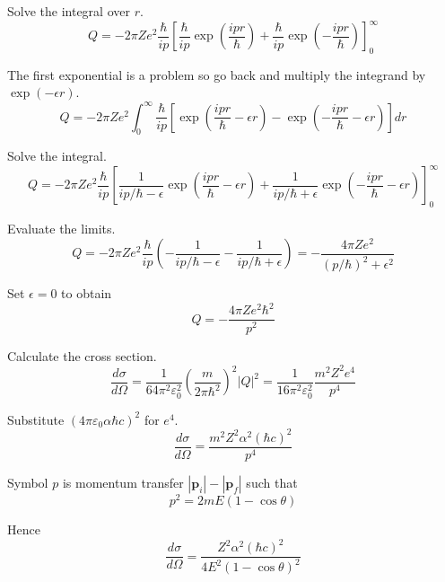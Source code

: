 Solve the integral over $r$.
\begin{equation*}
Q=-2\pi Ze^2\frac{\hbar}{ip}
\left[
\frac{\hbar}{ip}
\exp\left(\frac{ipr}{\hbar}\right)
+\frac{\hbar}{ip}
\exp\left(-\frac{ipr}{\hbar}\right)
\right]_0^\infty
\end{equation*}

The first exponential is a problem
so go back and multiply the integrand by $\exp(-\epsilon r)$.
\begin{equation*}
Q=-2\pi Ze^2
\int_0^\infty
\frac{\hbar}{ip}
\left[\exp\left(\frac{ipr}{\hbar}-\epsilon r\right)
-\exp\left(-\frac{ipr}{\hbar}-\epsilon r\right)\right]
dr
\end{equation*}

Solve the integral.
\begin{equation*}
Q=-2\pi Ze^2
\frac{\hbar}{ip}
\left[
\frac{1}{ip/\hbar-\epsilon}\exp\left(\frac{ipr}{\hbar}-\epsilon r\right)
+\frac{1}{ip/\hbar+\epsilon}\exp\left(-\frac{ipr}{\hbar}-\epsilon r\right)
\right]_0^\infty
\end{equation*}

Evaluate the limits.
\begin{equation*}
Q=-2\pi Ze^2
\frac{\hbar}{ip}
\left(-\frac{1}{ip/\hbar-\epsilon}-\frac{1}{ip/\hbar+\epsilon}\right)
=-\frac{4\pi Ze^2}{(p/\hbar)^2+\epsilon^2}
\tag{1}
\end{equation*}

Set $\epsilon=0$ to obtain
\begin{equation*}
Q=-\frac{4\pi Ze^2\hbar^2}{p^2}
\end{equation*}

Calculate the cross section.
\begin{equation*}
\frac{d\sigma}{d\Omega}=\frac{1}{64\pi^2\varepsilon_0^2}\left(\frac{m}{2\pi\hbar^2}\right)^2|Q|^2
=\frac{1}{16\pi^2\varepsilon_0^2}\frac{m^2Z^2e^4}{p^4}
\tag{2}
\end{equation*}

Substitute $(4\pi\varepsilon_0\alpha\hbar c)^2$ for $e^4$.
\begin{equation*}
\frac{d\sigma}{d\Omega}=\frac{m^2Z^2\alpha^2(\hbar c)^2}{p^4}
\end{equation*}

Symbol $p$ is momentum transfer $|\mathbf p_i|-|\mathbf p_f|$ such that
\begin{equation*}
p^2=2mE(1-\cos\theta)
\end{equation*}

Hence
\begin{equation*}
\frac{d\sigma}{d\Omega}=\frac{Z^2\alpha^2(\hbar c)^2}{4E^2(1-\cos\theta)^2}
\tag{3}
\end{equation*}

